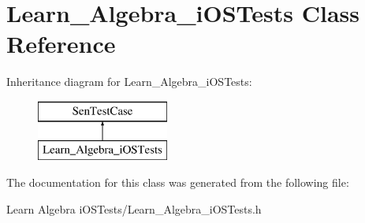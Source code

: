 \hypertarget{interface_learn___algebra__i_o_s_tests}{\section{Learn\-\_\-\-Algebra\-\_\-i\-O\-S\-Tests Class Reference}
\label{interface_learn___algebra__i_o_s_tests}
}
Inheritance diagram for Learn\-\_\-\-Algebra\-\_\-i\-O\-S\-Tests\-:\begin{figure}[H]
\begin{center}
\leavevmode
\includegraphics[height=2.000000cm]{interface_learn___algebra__i_o_s_tests}
\end{center}
\end{figure}


The documentation for this class was generated from the following file\-:\begin{DoxyCompactItemize}
\item 
Learn Algebra i\-O\-S\-Tests/Learn\-\_\-\-Algebra\-\_\-i\-O\-S\-Tests.\-h\end{DoxyCompactItemize}
